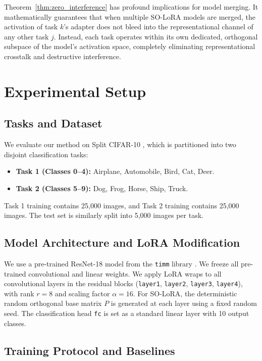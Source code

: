 \documentclass{article}
\theoremstyle{plain}
\theoremstyle{definition}
\theoremstyle{remark}
\begin{document}
Theorem~\ref{thm:zero_interference} has profound implications for model merging. It mathematically guarantees that when multiple SO-LoRA models are merged, the activation of task $k$'s adapter does not bleed into the representational channel of any other task $j$. Instead, each task operates within its own dedicated, orthogonal subspace of the model's activation space, completely eliminating representational crosstalk and destructive interference.

\section{Experimental Setup}
\label{experiments}

\subsection{Tasks and Dataset}

We evaluate our method on Split CIFAR-10 \cite{krizhevsky2009learning}, which is partitioned into two disjoint classification tasks:
\begin{itemize}
  \item \textbf{Task 1 (Classes 0--4):} Airplane, Automobile, Bird, Cat, Deer.
  \item \textbf{Task 2 (Classes 5--9):} Dog, Frog, Horse, Ship, Truck.
\end{itemize}
Task 1 training contains 25,000 images, and Task 2 training contains 25,000 images. The test set is similarly split into 5,000 images per task.

\subsection{Model Architecture and LoRA Modification}

We use a pre-trained ResNet-18 model \cite{he2016deep} from the \texttt{timm} library \cite{timm}. We freeze all pre-trained convolutional and linear weights. We apply LoRA wraps to all convolutional layers in the residual blocks (\texttt{layer1}, \texttt{layer2}, \texttt{layer3}, \texttt{layer4}), with rank $r=8$ and scaling factor $\alpha=16$. For SO-LoRA, the deterministic random orthogonal base matrix $P$ is generated at each layer using a fixed random seed.
The classification head \texttt{fc} is set as a standard linear layer with 10 output classes.

\subsection{Training Protocol and Baselines}
\end{document}
